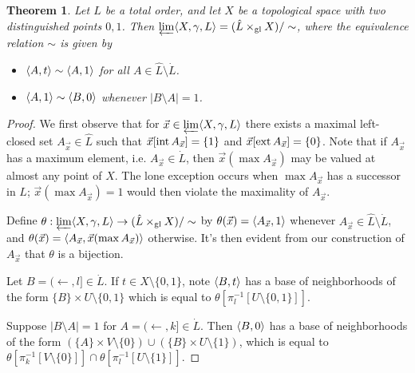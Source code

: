 \documentclass{amsart}
\theoremstyle{plain}
\newtheorem{theorem}{Theorem}
\theoremstyle{definition}
\theoremstyle{remark}
\theoremstyle{plain}
\theoremstyle{definition}
\theoremstyle{remark}
\begin{document}
\begin{theorem}
  Let \(L\) be a total order, and let \(X\) be a topological space with
  two distinguished points \(0,1\). Then
  \(\varprojlim\langle X,\gamma,L\rangle=(\hat L\times_{\operatorname{gl}} X)/\sim\), where the
  equivalence relation \(\sim\) is given by
  \begin{itemize}
    \item \(\langle A,t\rangle\sim\langle A,1\rangle\) for all \(A\in\hat L\setminus \dot L\).
    \item \(\langle A,1\rangle\sim\langle B,0\rangle\) whenever \(|B\setminus A|=1\).
  \end{itemize}
\end{theorem}

\begin{proof}
  We first observe that for \(\vec x\in\varprojlim\langle X,\gamma,L\rangle\) there
  exists a maximal left-closed set
  \(A_{\vec x}\in\hat L\) such that \(\vec x[\operatorname{int} A_{\vec x}]=\{1\}\)
  and \(\vec x[\operatorname{ext} A_{\vec x}]=\{0\}\). Note that if \(A_{\vec x}\) has
  a maximum element, i.e. \(A_{\vec x}\in \dot L\),
  then \(\vec x(\max A_{\vec x})\) may be valued at almost any point of \(X\).
  The lone exception occurs when \(\max A_{\vec x}\) has a successor in \(L\);
  \(\vec x(\max A_{\vec x})=1\) would then violate the maximality of
  \(A_{\vec x}\).

  Define \(\theta:\varprojlim\langle X,\gamma,L\rangle\to(\hat L\times_{\operatorname{gl}} X)/\sim\)
  by \(\theta(\vec x)=\langle A_{\vec x},1\rangle\) whenever
  \(A_{\vec x}\in\hat L\setminus \dot L\), and
  \(\theta(\vec x)=\langle A_{\vec x},\vec x(\max A_{\vec x})\rangle\) otherwise.
  It's then evident from our construction of \(A_{\vec x}\)
  that \(\theta\) is a bijection.

  Let \(B=(\leftarrow,l]\in\dot L\). If \(t\in X\setminus\{0,1\}\), note
  \(\langle B,t\rangle\) has a base of neighborhoods of
  the form \(\{B\}\times U\setminus\{0,1\}\) which is equal to
  \(\theta[\pi_l^{-1}[U\setminus\{0,1\}]]\).

  Suppose \(|B\setminus A|=1\) for \(A=(\leftarrow,k]\in\dot L\).
  Then \(\langle B,0\rangle\) has a base of neighborhoods of the form
  \(
    (\{A\}\times V\setminus\{0\})
      \cup
    (\{B\}\times U\setminus \{1\})
  \), which is equal to
  \(\theta[\pi_k^{-1}[V\setminus\{0\}]]\cap\theta[\pi_l^{-1}[U\setminus\{1\}]]\).


\end{proof}






\end{document}
